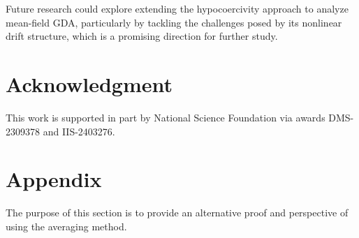 \documentclass[11pt]{article}
\newcommand{\1}{\mathds{1}}
\begin{document}
Future research could explore extending the hypocoercivity approach to analyze mean-field GDA, particularly by tackling the challenges posed by its nonlinear drift structure, which is a promising direction for further study.



\section*{Acknowledgment}

This work is supported in part by National Science Foundation via awards DMS-2309378 and IIS-2403276. 

\appendix
\section{Appendix}\label{sec:appendixa}
The purpose of this section is to provide an alternative proof and perspective of \cite[Proposition 3.1]{wang2024local} using the averaging method.
\end{document}
